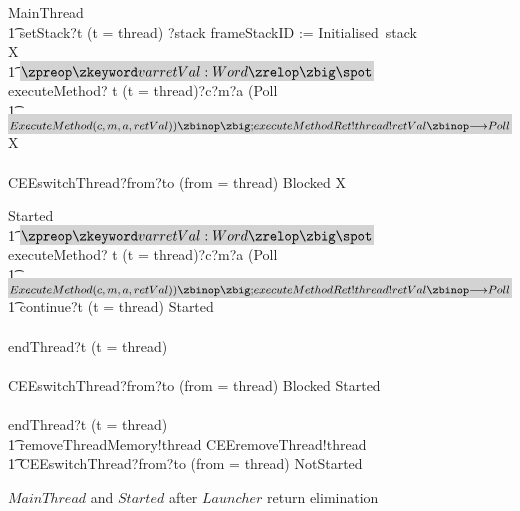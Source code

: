 \begin{figure}[tp!]
  \centering
  \setlength{\zedtab}{0.4cm}
  \setlength{\zedindent}{0pt}
  \setlength{\zedleftsep}{0pt}
  \setlength{\abovedisplayskip}{0pt}
  \setlength{\belowdisplayskip}{0pt}
  \setlength{\abovedisplayshortskip}{0pt}
  \setlength{\belowdisplayshortskip}{0pt}
  \begin{circusaction}
    MainThread \circdef \\
    \t1 setStack?t \prefixcolon (t = thread) ?stack \then frameStackID := Initialised~stack \circseq \circmu X \circspot \\
    \t1 \circblockbegin
    \colorbox{lightgray}{$\circvar retVal : Word \circspot$}
    executeMethod? t \prefixcolon (t = thread)?c?m?a \then (Poll \circseq \\
    \t1 \colorbox{lightgray}{$ExecuteMethod(c, m, a, retVal)) \circseq
    executeMethodRet!thread!retVal \then Poll$} \circseq  X \\
    {} \extchoice {} \\
    CEEswitchThread?from?to \prefixcolon (from = thread) \then Blocked \circseq X
    \circblockend
  \end{circusaction}
  
  \begin{circusaction}
    Started \circdef \\
    \t1 \circblockbegin
    \colorbox{lightgray}{$\circvar retVal : Word \circspot$} executeMethod? t \prefixcolon (t = thread)?c?m?a \then (Poll \circseq \\
    \t1 \colorbox{lightgray}{$ExecuteMethod(c, m, a, retVal)) \circseq executeMethodRet!thread!retVal \then Poll$} \circseq \\
    \t1 \circblockbegin
    continue?t \prefixcolon (t = thread) \then Started \\
    {} \extchoice {} \\
    endThread?t \prefixcolon (t = thread) \then \Skip
    \circblockend \\
    {} \extchoice {} \\
    CEEswitchThread?from?to \prefixcolon (from = thread) \then Blocked \circseq Started \\
    {} \extchoice {} \\
    endThread?t \prefixcolon (t = thread) \then \Skip
    \circblockend \circseq \\
    \t1 removeThreadMemory!thread \then CEEremoveThread!thread \\
    \t1 {} \then CEEswitchThread?from?to \prefixcolon (from = thread) \then NotStarted
  \end{circusaction}
  \caption{$MainThread$ and $Started$ after $Launcher$ return
    elimination}
  \label{efs-eliminate-returns-MainThread-Started-figure}
\end{figure}

